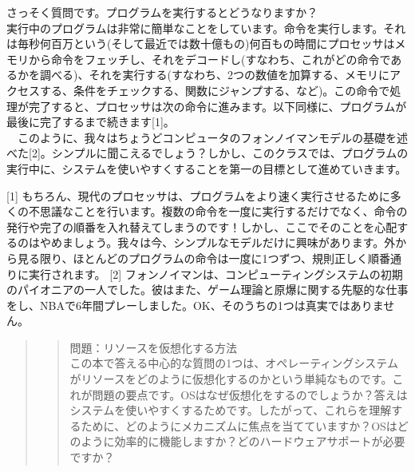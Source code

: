 さっそく質問です。プログラムを実行するとどうなりますか？\\
実行中のプログラムは非常に簡単なことをしています。命令を実行します。それは毎秒何百万という(そして最近では数十億もの)何百もの時間にプロセッサはメモリから命令をフェッチし、それをデコードし(すなわち、これがどの命令であるかを調べる)、それを実行する(すなわち、2つの数値を加算する、メモリにアクセスする、条件をチェックする、関数にジャンプする、など)。この命令で処理が完了すると、プロセッサは次の命令に進みます。以下同様に、プログラムが最後に完了するまで続きます{[}1{]}。\\
　このように、我々はちょうどコンピュータのフォンノイマンモデルの基礎を述べた{[}2{]}。シンプルに聞こえるでしょう？しかし、このクラスでは、プログラムの実行中に、システムを使いやすくすることを第一の目標として進めていきます。

{[}1{]}
もちろん、現代のプロセッサは、プログラムをより速く実行させるために多くの不思議なことを行います。複数の命令を一度に実行するだけでなく、命令の発行や完了の順番を入れ替えてしまうのです！しかし、ここでそのことを心配するのはやめましょう。我々は今、シンプルなモデルだけに興味があります。外から見る限り、ほとんどのプログラムの命令は一度に1つずつ、規則正しく順番通りに実行されます。
{[}2{]}
フォンノイマンは、コンピューティングシステムの初期のパイオニアの一人でした。彼はまた、ゲーム理論と原爆に関する先駆的な仕事をし、NBAで6年間プレーしました。OK、そのうちの1つは真実ではありません。

\begin{quote}
\begin{quote}
問題：リソースを仮想化する方法\\
この本で答える中心的な質問の1つは、オペレーティングシステムがリソースをどのように仮想化するのかという単純なものです。これが問題の要点です。OSはなぜ仮想化をするのでしょうか？答えはシステムを使いやすくするためです。したがって、これらを理解するために、どのようにメカニズムに焦点を当てていますか？OSはどのように効率的に機能しますか？どのハードウェアサポートが必要ですか？
\end{quote}
\end{quote}

